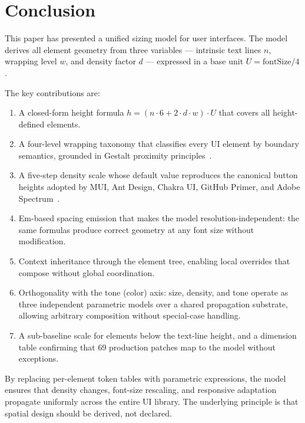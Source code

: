 \section{Conclusion}
\label{sec:conclusion}

This paper has presented a unified sizing model for user interfaces. The model derives all element geometry from three variables --- intrinsic text lines $n$, wrapping level $w$, and density factor $d$ --- expressed in a base unit $U = \text{fontSize} / 4$.

The key contributions are:

\begin{enumerate}
  \item A closed-form height formula $h = (n \cdot 6 + 2 \cdot d \cdot w) \cdot U$ that covers all height-defined elements.

  \item A four-level wrapping taxonomy that classifies every UI element by boundary semantics, grounded in Gestalt proximity principles~\cite{wertheimer1923,wagemans2012}.

  \item A five-step density scale whose default value reproduces the canonical button heights adopted by MUI, Ant Design, Chakra UI, GitHub Primer, and Adobe Spectrum~\cite{mui,antdesign,chakra,primer,spectrum}.

  \item Em-based spacing emission that makes the model resolution-independent: the same formulas produce correct geometry at any font size without modification.

  \item Context inheritance through the element tree, enabling local overrides that compose without global coordination.

  \item Orthogonality with the tone (color) axis: size, density, and tone operate as three independent parametric models over a shared propagation substrate, allowing arbitrary composition without special-case handling.

  \item A sub-baseline scale for elements below the text-line height, and a dimension table confirming that 69 production patches map to the model without exceptions.
\end{enumerate}

By replacing per-element token tables with parametric expressions, the model ensures that density changes, font-size rescaling, and responsive adaptation propagate uniformly across the entire UI library. The underlying principle is that spatial design should be derived, not declared.
